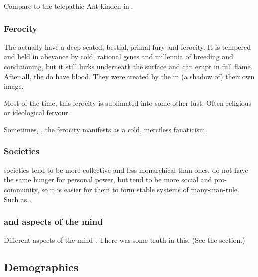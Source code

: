 Compare to the telepathic Ant-kinden in \cite{AdrianTchaikovsky:ShadowsoftheApt}. 





\subsubsection{Ferocity}
The \scathae{} actually have a deep-seated, bestial, primal fury and ferocity. 
It is tempered and held in abeyance by cold, rational \ophidian{} genes and millennia of breeding and conditioning, but it still lurks underneath the surface and can erupt in full flame. 
After all, the \scathae{} do have \xsic{} blood. 
They were created by the \dzraicchenosses{} in (a shadow of) their own image. 

Most of the time, this ferocity is sublimated into some other lust. 
Often religious or ideological fervour. 

Sometimes, , the ferocity manifests as a cold, merciless fanaticism. 





\subsubsection{Societies}
\Scathaese{} societies tend to be more collective and less monarchical than \human{} ones. 
\Scathae{} do not have the same hunger for personal power, but tend to be more social and pro-community, so it is easier for them to form stable systems of many-man-rule. 
Such as . 





\subsubsection{\XzaiShanns and aspects of the mind}
Different aspects of the \scathaese mind .
There was some truth in this. 
(See the section.)









\subsection{Demographics}

